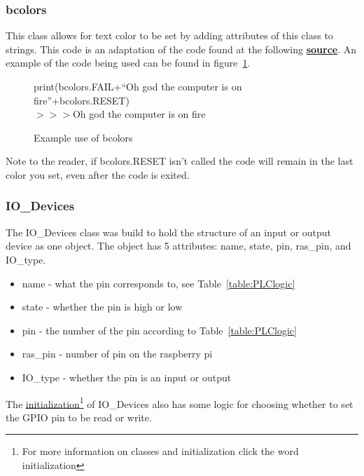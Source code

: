 \documentclass{article}
\begin{document}
\subsubsection{bcolors}
This class allows for text color to be set by adding attributes of this class to strings. This code is an adaptation of the code found at the following \textbf{\href{https://stackoverflow.com/questions/287871/how-to-print-colored-text-to-the-terminal}{source}}. An example of the code being used can be found in figure~\ref{fig:bcolors}.

\begin{center}
    \begin{figure}[h!]
        print(bcolors.FAIL+``Oh god the computer is on fire''+bcolors.RESET)\\
        $>$$>$$>${\color{red}Oh god the computer is on fire}
      \caption{Example use of bcolors}
      \label{fig:bcolors}
    \end{figure}
\end{center}

Note to the reader, if bcolors.RESET isn't called the code will remain in the last color you set, even after the code is exited.


\subsubsection{IO\_Devices}
The IO\_Devices class was build to hold the structure of an input or output device as one object. The object has 5 attributes: name, state, pin, ras\_pin, and  IO\_type.

\begin{itemize}
    \item name - what the pin corresponds to, see Table~\ref{table:PLClogic}
    \item state - whether the pin is high or low 
    \item pin - the number of the pin according to Table~\ref{table:PLClogic}
    \item ras\_pin - number of pin on the raspberry pi
    \item IO\_type - whether the pin is an input or output
\end{itemize}
The \href{https://www.w3schools.com/python/python_classes.asp}{initialization}\footnote{For more information on classes and initialization click the word initialization} of IO\_Devices also has some logic for choosing whether to set the GPIO pin to be read or write.\\
\end{document}
